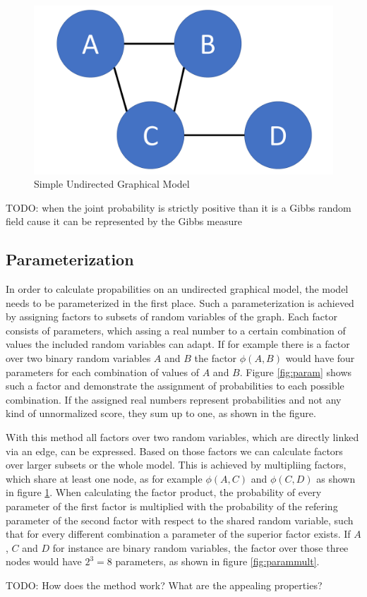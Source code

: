 \begin{figure}[htpb]
  \centering
  	\includegraphics[scale=0.3]{img/basic.pdf} 
  \caption{Simple Undirected Graphical Model}
  \label{fig:basic}
\end{figure}

TODO: when the joint probability is strictly positive than it is a Gibbs random field cause it can be represented by the Gibbs measure


\subsection{Parameterization}

In order to calculate propabilities on an undirected graphical model, the model needs to be parameterized in the first place. Such a parameterization is achieved by assigning factors to subsets of random variables of the graph. Each factor consists of parameters, which assing a real number to a certain combination of values the included random variables can adapt. If for example there is a factor over two binary random variables $A$ and $B$ the factor $\phi(A,B)$ would have four parameters for each combination of values of $A$ and $B$. Figure \ref{fig:param} shows such a factor and demonstrate the assignment of probabilities to each possible combination. If the assigned real numbers represent probabilities and not any kind of unnormalized score, they sum up to one, as shown in the figure. 

With this method all factors over two random variables, which are directly linked via an edge, can be expressed. Based on those factors we can calculate factors over larger subsets or the whole model. This is achieved by multipliing factors, which share at least one node, as for example $\phi(A,C)$ and $\phi(C,D)$ as shown in figure \ref{fig:basic}. When calculating the factor product, the probability of every parameter of the first factor is multiplied with the probability of the refering parameter of the second factor with respect to the shared random variable, such that for every different combination a parameter of the superior factor exists. If $A$, $C$ and $D$ for instance are binary random variables, the factor over those three nodes would have $2^3=8$ parameters, as shown in figure \ref{fig:parammult}.



TODO: How does the method work? What are the appealing properties?
